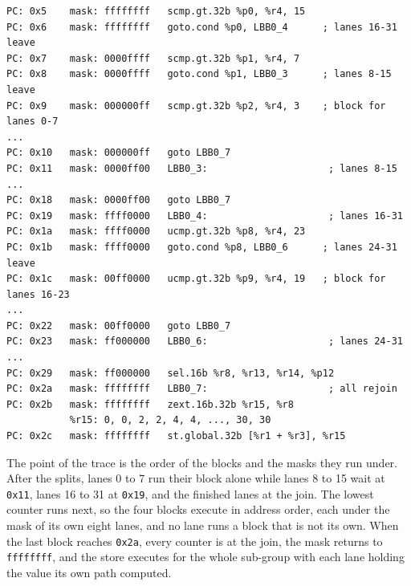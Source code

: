 \begin{lstlisting}[caption={[Trace of nested\_if]Trace of
\texttt{nested\_if}, abridged: the three splits, the four blocks, and
the join.}, label={lst:trace-forward}]
PC: 0x5    mask: ffffffff   scmp.gt.32b %p0, %r4, 15
PC: 0x6    mask: ffffffff   goto.cond %p0, LBB0_4      ; lanes 16-31 leave
PC: 0x7    mask: 0000ffff   scmp.gt.32b %p1, %r4, 7
PC: 0x8    mask: 0000ffff   goto.cond %p1, LBB0_3      ; lanes 8-15 leave
PC: 0x9    mask: 000000ff   scmp.gt.32b %p2, %r4, 3    ; block for lanes 0-7
...
PC: 0x10   mask: 000000ff   goto LBB0_7
PC: 0x11   mask: 0000ff00   LBB0_3:                     ; lanes 8-15
...
PC: 0x18   mask: 0000ff00   goto LBB0_7
PC: 0x19   mask: ffff0000   LBB0_4:                     ; lanes 16-31
PC: 0x1a   mask: ffff0000   ucmp.gt.32b %p8, %r4, 23
PC: 0x1b   mask: ffff0000   goto.cond %p8, LBB0_6      ; lanes 24-31 leave
PC: 0x1c   mask: 00ff0000   ucmp.gt.32b %p9, %r4, 19   ; block for lanes 16-23
...
PC: 0x22   mask: 00ff0000   goto LBB0_7
PC: 0x23   mask: ff000000   LBB0_6:                     ; lanes 24-31
...
PC: 0x29   mask: ff000000   sel.16b %r8, %r13, %r14, %p12
PC: 0x2a   mask: ffffffff   LBB0_7:                     ; all rejoin
PC: 0x2b   mask: ffffffff   zext.16b.32b %r15, %r8
           %r15: 0, 0, 2, 2, 4, 4, ..., 30, 30
PC: 0x2c   mask: ffffffff   st.global.32b [%r1 + %r3], %r15
\end{lstlisting}

The point of the trace is the order of the blocks and the masks they
run under. After the splits, lanes 0 to 7 run their block alone while
lanes 8 to 15 wait at \texttt{0x11}, lanes 16 to 31 at \texttt{0x19},
and the finished lanes at the join. The lowest counter runs next, so
the four blocks execute in address order, each under the mask of its
own eight lanes, and no lane runs a block that is not its own. When
the last block reaches \texttt{0x2a}, every counter is at the join,
the mask returns to \texttt{ffffffff}, and the store executes for the
whole sub-group with each lane holding the value its own path
computed.

